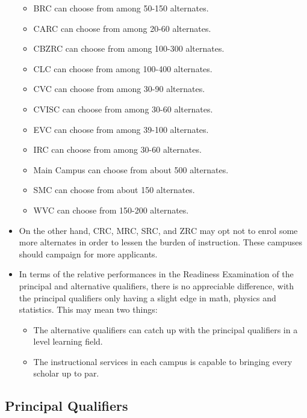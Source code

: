 \documentclass[]{article}
\providecommand{\tightlist}{%
  \setlength{\itemsep}{0pt}\setlength{\parskip}{0pt}}
\begin{document}
\begin{itemize}
  \begin{itemize}
  \tightlist
  \item
    BRC can choose from among 50-150 alternates.
  \item
    CARC can choose from among 20-60 alternates.
  \item
    CBZRC can choose from among 100-300 alternates.
  \item
    CLC can choose from among 100-400 alternates.
  \item
    CVC can choose from among 30-90 alternates.
  \item
    CVISC can choose from among 30-60 alternates.
  \item
    EVC can choose from among 39-100 alternates.
  \item
    IRC can choose from among 30-60 alternates.
  \item
    Main Campus can choose from about 500 alternates.
  \item
    SMC can choose from about 150 alternates.
  \item
    WVC can choose from 150-200 alternates.
  \end{itemize}
\item
  On the other hand, CRC, MRC, SRC, and ZRC may opt not to enrol some
  more alternates in order to lessen the burden of instruction. These
  campuses should campaign for more applicants.
\item
  In terms of the relative performances in the Readiness Examination of
  the principal and alternative qualifiers, there is no appreciable
  difference, with the principal qualifiers only having a slight edge in
  math, physics and statistics. This may mean two things:

  \begin{itemize}
  \tightlist
  \item
    The alternative qualifiers can catch up with the principal
    qualifiers in a level learning field.
  \item
    The instructional services in each campus is capable to bringing
    every scholar up to par.
  \end{itemize}
\end{itemize}

\hypertarget{principal-qualifiers}{%
\subsection{Principal Qualifiers}\label{principal-qualifiers}}
\end{document}
